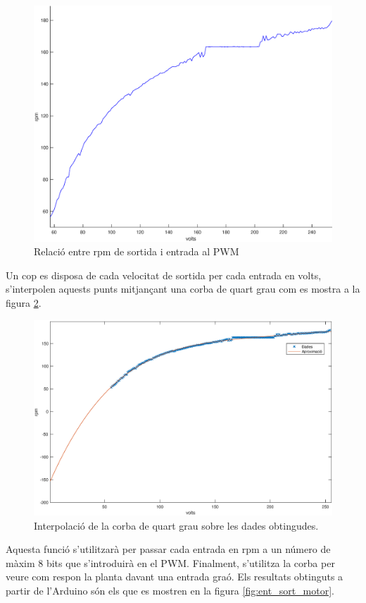 \documentclass[]{article}
\begin{document}
\begin{figure}[H]
\centering
	\includegraphics[width = .8\linewidth]{images/rpm_volt_dades.eps}
	\caption{Relació entre rpm de sortida i entrada al PWM}
	\label{fig:rpm_volt_dades}
\end{figure}

Un cop es disposa de cada velocitat de sortida per cada entrada en volts, s'interpolen aquests punts mitjançant una corba de quart grau com es mostra a la figura \ref{fig:rpm_volt_poly_plot}.

\begin{figure}[H]
\centering
	\includegraphics[width = .8\linewidth]{images/rpm_volt_poly_plot.eps}
	\caption{Interpolació de la corba de quart grau sobre les dades obtingudes.}
	\label{fig:rpm_volt_poly_plot}
\end{figure}

Aquesta funció s'utilitzarà per passar cada entrada en rpm a un número de màxim 8 bits que s'introduirà en el PWM. Finalment, s'utilitza la corba per veure com respon la planta davant una entrada graó. Els resultats obtinguts a partir de l'Arduino són els que es mostren en la figura \ref{fig:ent_sort_motor}.
\end{document}

